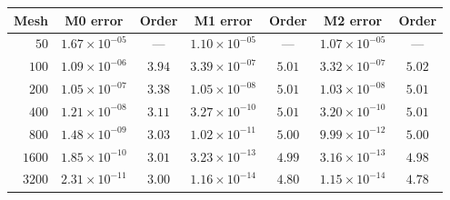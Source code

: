 \begin{tabular}{|r||c|c||c|c||c|c|}
\hline
\bf{Mesh} & \bf{M0 error} & \bf{Order} & \bf{M1 error} & \bf{Order} & \bf{M2 error} & \bf{Order}\\
\hline
\hline
$  50$ & $1.67\times 10^{-05}$ & --- & $1.10\times 10^{-05}$ & --- & $1.07\times 10^{-05}$ & ---\\
\hline
$ 100$ & $1.09\times 10^{-06}$ & $3.94$ & $3.39\times 10^{-07}$ & $5.01$ & $3.32\times 10^{-07}$ & $5.02$\\
\hline
$ 200$ & $1.05\times 10^{-07}$ & $3.38$ & $1.05\times 10^{-08}$ & $5.01$ & $1.03\times 10^{-08}$ & $5.01$\\
\hline
$ 400$ & $1.21\times 10^{-08}$ & $3.11$ & $3.27\times 10^{-10}$ & $5.01$ & $3.20\times 10^{-10}$ & $5.01$\\
\hline
$ 800$ & $1.48\times 10^{-09}$ & $3.03$ & $1.02\times 10^{-11}$ & $5.00$ & $9.99\times 10^{-12}$ & $5.00$\\
\hline
$1600$ & $1.85\times 10^{-10}$ & $3.01$ & $3.23\times 10^{-13}$ & $4.99$ & $3.16\times 10^{-13}$ & $4.98$\\
\hline
$3200$ & $2.31\times 10^{-11}$ & $3.00$ & $1.16\times 10^{-14}$ & $4.80$ & $1.15\times 10^{-14}$ & $4.78$\\
\hline
\end{tabular}
